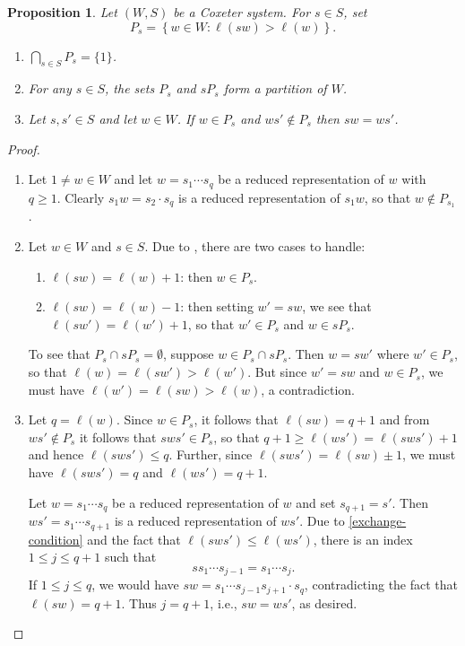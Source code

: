\documentclass{article}
\theoremstyle{thmstyle}
\newtheorem{proposition}[theorem]{Proposition}
\theoremstyle{defstyle}
\renewcommand{\le}{\leqslant}
\renewcommand{\ge}{\geqslant}
\begin{document}
\begin{proposition}
    Let $(W, S)$ be a Coxeter system. For $s\in S$, set 
    \begin{equation*}
        P_s = \left\{w\in W\colon \ell(sw) > \ell(w)\right\}.
    \end{equation*}
    \begin{enumerate}[label=(\Roman*)]
        \item $\displaystyle\bigcap_{s\in S} P_s = \{1\}$.
        \item For any $s\in S$, the sets $P_s$ and $sP_s$ form a partition of $W$. 
        \item Let $s, s'\in S$ and let $w\in W$. If $w\in P_s$ and $ws'\notin P_s$ then $sw = ws'$. \label{condition-for-next-proposition}
    \end{enumerate}
\end{proposition}
\begin{proof}
\begin{enumerate}[label=(\Roman*)]
    \item Let $1\ne w\in W$ and let $w = s_1\cdots s_q$ be a reduced representation of $w$ with $q\ge 1$. Clearly $s_1w = s_2\cdot s_q$ is a reduced representation of $s_1w$, so that $w\notin P_{s_1}$. 
    
    \item Let $w\in W$ and $s\in S$. Due to , there are two cases to handle: 
    \begin{enumerate}[label=(\roman*)]
        \item $\ell(sw) = \ell(w) + 1$: then $w\in P_s$. 
        \item $\ell(sw) = \ell(w) - 1$: then setting $w' = sw$, we see that $\ell(sw') = \ell(w') + 1$, so that $w'\in P_s$ and $w\in sP_s$.
    \end{enumerate}
    To see that $P_s\cap sP_s = \emptyset$, suppose $w\in P_s\cap sP_s$. Then $w = sw'$ where $w'\in P_s$, so that $\ell(w) = \ell(sw') > \ell(w')$. But since $w' = sw$ and $w\in P_s$, we must have $\ell(w') = \ell(sw) > \ell(w)$, a contradiction.

    \item Let $q = \ell(w)$. Since $w\in P_s$, it follows that $\ell(sw) = q + 1$ and from $ws'\notin P_s$ it follows that $sws'\in P_s$, so that $q + 1\ge\ell(ws') = \ell(sws') + 1$ and hence $\ell(sws')\le q$. Further, since $\ell(sws') = \ell(sw) \pm 1$, we must have $\ell(sws') = q$ and $\ell(ws') = q + 1$.

    Let $w = s_1\cdots s_q$ be a reduced representation of $w$ and set $s_{q + 1} = s'$. Then $ws' = s_1\cdots s_{q + 1}$ is a reduced representation of $ws'$. Due to \ref{exchange-condition} and the fact that $\ell(sws')\le\ell(ws')$, there is an index $1\le j\le q + 1$ such that 
    \begin{equation*}
        ss_1\cdots s_{j - 1} = s_1\cdots s_j.
    \end{equation*}
    If $1\le j\le q$, we would have $sw = s_1\cdots s_{j - 1}s_{j + 1}\cdot s_q$, contradicting the fact that $\ell(sw) = q + 1$. Thus $j = q + 1$, i.e., $sw = ws'$, as desired. \qedhere
\end{enumerate}
\end{proof}
\end{document}
